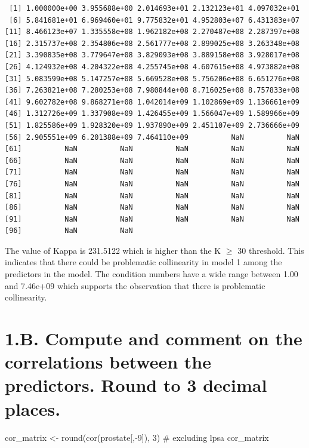 \documentclass[
  letterpaper,
  DIV=11,
  numbers=noendperiod]{scrartcl}
\newenvironment{Shaded}{\begin{snugshade}}{\end{snugshade}}
\newcommand{\CommentTok}[1]{\textcolor[rgb]{0.37,0.37,0.37}{#1}}
\newcommand{\DecValTok}[1]{\textcolor[rgb]{0.68,0.00,0.00}{#1}}
\newcommand{\FunctionTok}[1]{\textcolor[rgb]{0.28,0.35,0.67}{#1}}
\newcommand{\NormalTok}[1]{\textcolor[rgb]{0.00,0.23,0.31}{#1}}
\newcommand{\OtherTok}[1]{\textcolor[rgb]{0.00,0.23,0.31}{#1}}
\newcommand{\SpecialCharTok}[1]{\textcolor[rgb]{0.37,0.37,0.37}{#1}}
\begin{document}
\begin{verbatim}
 [1] 1.000000e+00 3.955688e+00 2.014693e+01 2.132123e+01 4.097032e+01
 [6] 5.841681e+01 6.969460e+01 9.775832e+01 4.952803e+07 6.431383e+07
[11] 8.466123e+07 1.335558e+08 1.962182e+08 2.270487e+08 2.287397e+08
[16] 2.315737e+08 2.354806e+08 2.561777e+08 2.899025e+08 3.263348e+08
[21] 3.390835e+08 3.779647e+08 3.829093e+08 3.889158e+08 3.928017e+08
[26] 4.124932e+08 4.204322e+08 4.255745e+08 4.607615e+08 4.973882e+08
[31] 5.083599e+08 5.147257e+08 5.669528e+08 5.756206e+08 6.651276e+08
[36] 7.263821e+08 7.280253e+08 7.980844e+08 8.716025e+08 8.757833e+08
[41] 9.602782e+08 9.868271e+08 1.042014e+09 1.102869e+09 1.136661e+09
[46] 1.312726e+09 1.337908e+09 1.426455e+09 1.566047e+09 1.589966e+09
[51] 1.825586e+09 1.928320e+09 1.937890e+09 2.451107e+09 2.736666e+09
[56] 2.905551e+09 6.201388e+09 7.464110e+09          NaN          NaN
[61]          NaN          NaN          NaN          NaN          NaN
[66]          NaN          NaN          NaN          NaN          NaN
[71]          NaN          NaN          NaN          NaN          NaN
[76]          NaN          NaN          NaN          NaN          NaN
[81]          NaN          NaN          NaN          NaN          NaN
[86]          NaN          NaN          NaN          NaN          NaN
[91]          NaN          NaN          NaN          NaN          NaN
[96]          NaN          NaN
\end{verbatim}

The value of Kappa is 231.5122 which is higher than the K \(\ge\) 30
threshold. This indicates that there could be problematic collinearity
in model 1 among the predictors in the model. The condition numbers have
a wide range between 1.00 and 7.46e+09 which supports the observation
that there is problematic collinearity.

\hypertarget{b.-compute-and-comment-on-the-correlations-between-the-predictors.-round-to-3-decimal-places.}{%
\section{1.B. Compute and comment on the correlations between the
predictors. Round to 3 decimal
places.}\label{b.-compute-and-comment-on-the-correlations-between-the-predictors.-round-to-3-decimal-places.}}

\begin{Shaded}
\begin{Highlighting}[]
\NormalTok{cor\_matrix }\OtherTok{\textless{}{-}} \FunctionTok{round}\NormalTok{(}\FunctionTok{cor}\NormalTok{(prostate[,}\SpecialCharTok{{-}}\DecValTok{9}\NormalTok{]), }\DecValTok{3}\NormalTok{)  }\CommentTok{\# excluding lpsa}
\NormalTok{cor\_matrix}
\end{Highlighting}
\end{Shaded}
\end{document}
